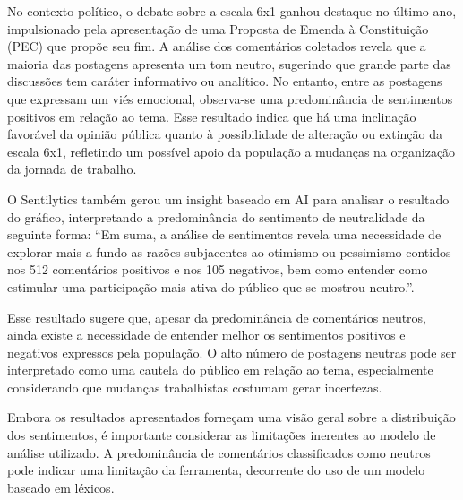 \documentclass[
	12pt,				%
	oneside,			%
	a4paper,			%
	english,			%
	french,				%
	spanish,			%
	brazil				%
	]{abntex2}
\begin{document}
No contexto político, o debate sobre a escala 6x1 ganhou destaque no
último ano, impulsionado pela apresentação de uma Proposta de Emenda à
Constituição (PEC) que propõe seu fim. A análise dos comentários
coletados revela que a maioria das postagens apresenta um tom neutro,
sugerindo que grande parte das discussões tem caráter informativo ou
analítico. No entanto, entre as postagens que expressam um viés
emocional, observa-se uma predominância de sentimentos positivos em
relação ao tema. Esse resultado indica que há uma inclinação favorável
da opinião pública quanto à possibilidade de alteração ou extinção da
escala 6x1, refletindo um possível apoio da população a mudanças na
organização da jornada de trabalho.

O Sentilytics também gerou um insight baseado em AI para analisar o
resultado do gráfico, interpretando a predominância do sentimento de
neutralidade da seguinte forma: ``Em suma, a análise de sentimentos
revela uma necessidade de explorar mais a fundo as razões subjacentes ao
otimismo ou pessimismo contidos nos 512 comentários positivos e nos 105
negativos, bem como entender como estimular uma participação mais ativa
do público que se mostrou neutro.''.

Esse resultado sugere que, apesar da predominância de comentários
neutros, ainda existe a necessidade de entender melhor os sentimentos
positivos e negativos expressos pela população. O alto número de
postagens neutras pode ser interpretado como uma cautela do público em
relação ao tema, especialmente considerando que mudanças trabalhistas
costumam gerar incertezas.

Embora os resultados apresentados forneçam uma visão geral sobre a
distribuição dos sentimentos, é importante considerar as limitações
inerentes ao modelo de análise utilizado. A predominância de comentários
classificados como neutros pode indicar uma limitação da ferramenta,
decorrente do uso de um modelo baseado em léxicos.
\end{document}
